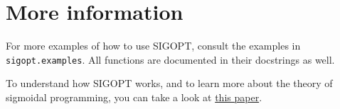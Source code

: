 \documentclass[letterpaper,10pt,english]{/Users/madeleineudell/anaconda/lib/python2.7/site-packages/sphinx/texinputs/sphinxhowto}
\begin{document}
        
    
\section{More information}For more examples of how to use SIGOPT, consult the examples in
\texttt{sigopt.examples}. All functions are documented in their
docstrings as well.

To understand how SIGOPT works, and to learn more about the theory of
sigmoidal programming, you can take a look at
\href{www.stanford.edu/~udell/doc/max_sum_sigmoids.pdf}{this paper}.
        

        \renewcommand{\indexname}{Index}
        \printindex

    
\end{document}

